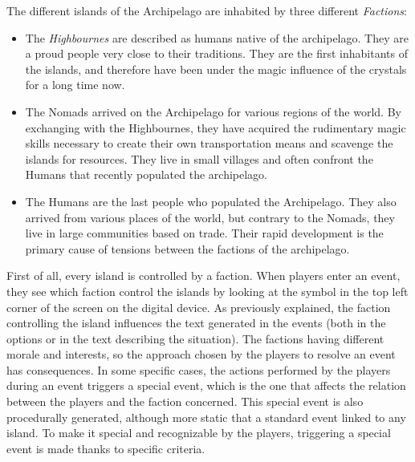 The different islands of the Archipelago are inhabited by three different \textit{Factions}:
\begin{itemize}
\item The \textit{Highbournes} are described as humans native of the archipelago. They are a proud people very close to their traditions. They are the first inhabitants of the islands, and therefore have been under the magic influence of the crystals for a long time now.
\item The Nomads arrived on the Archipelago for various regions of the world. By exchanging with the Highbournes, they have acquired the rudimentary magic skills necessary to create their own transportation means and scavenge the islands for resources. They live in small villages and often confront the Humans that recently populated the archipelago.
\item The Humans are the last people who populated the Archipelago. They also arrived from various places of the world, but contrary to the Nomads, they live in large communities based on trade. Their rapid development is the primary cause of tensions between the factions of the archipelago.
\end{itemize}
First of all, every island is controlled by a faction. When players enter an event, they see which faction control the islands by looking at the symbol in the top left corner of the screen on the digital device. As previously explained, the faction controlling the island influences the text generated in the events (both in the options or in the text describing the situation). The factions having different morale and interests, so the approach chosen by the players to resolve an event has consequences. In some specific cases, the actions performed by the players during an event triggers a special event, which is the one that affects the relation between the players and the faction concerned. This special event is also procedurally generated, although more static that a standard event linked to any island. To make it special and recognizable by the players, triggering a special event is made thanks to specific criteria.

